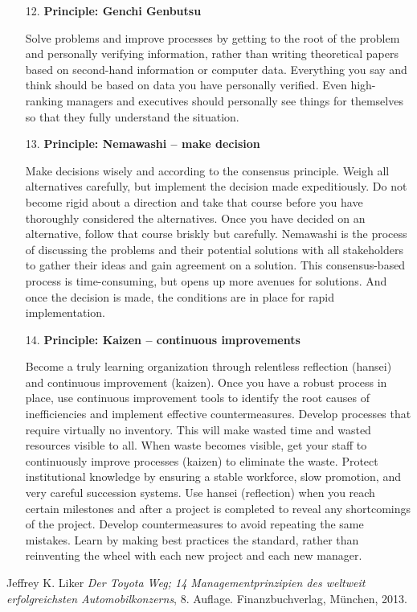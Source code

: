 \documentclass[11pt,a4paper]{article}
\begin{document}
\begin{enumerate}
\item[12.] \textbf{Principle: Genchi Genbutsu}
  
  Solve problems and improve processes by getting to the root of the problem
  and personally verifying information, rather than writing theoretical papers
  based on second-hand information or computer data. Everything you say and
  think should be based on data you have personally verified. Even
  high-ranking managers and executives should personally see things for
  themselves so that they fully understand the situation.

\item[13.] \textbf{Principle: Nemawashi -- make decision}
  
  Make decisions wisely and according to the consensus principle. Weigh all
  alternatives carefully, but implement the decision made expeditiously. Do
  not become rigid about a direction and take that course before you have
  thoroughly considered the alternatives. Once you have decided on an
  alternative, follow that course briskly but carefully. Nemawashi is the
  process of discussing the problems and their potential solutions with all
  stakeholders to gather their ideas and gain agreement on a solution. This
  consensus-based process is time-consuming, but opens up more avenues for
  solutions. And once the decision is made, the conditions are in place for
  rapid implementation.

\item[14.] \textbf{Principle: Kaizen -- continuous improvements}
  
  Become a truly learning organization through relentless reflection (hansei)
  and continuous improvement (kaizen). Once you have a robust process in
  place, use continuous improvement tools to identify the root causes of
  inefficiencies and implement effective countermeasures. Develop processes
  that require virtually no inventory. This will make wasted time and wasted
  resources visible to all. When waste becomes visible, get your staff to
  continuously improve processes (kaizen) to eliminate the waste. Protect
  institutional knowledge by ensuring a stable workforce, slow promotion, and
  very careful succession systems. Use hansei (reflection) when you reach
  certain milestones and after a project is completed to reveal any
  shortcomings of the project. Develop countermeasures to avoid repeating the
  same mistakes. Learn by making best practices the standard, rather than
  reinventing the wheel with each new project and each new manager.
\end{enumerate}
\begin{thebibliography}{99}
 Jeffrey K. Liker \emph{Der Toyota Weg; 14
  Managementprinzipien des weltweit erfolgreichsten Automobilkonzerns},
  8. Auf\-lage. Finanzbuchverlag, München, 2013.
\end{thebibliography}
\end{document}
